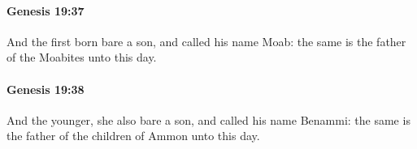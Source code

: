 		\paragraph{Genesis 19:37} %
			\label{GENESIS-19-37}

			And the first born bare a son, and called his name Moab: the same is the father of the Moabites unto this day.


		\paragraph{Genesis 19:38} %
			\label{GENESIS-19-38}

			And the younger, she also bare a son, and called his name Benammi: the same is the father of the children of Ammon unto this day.

